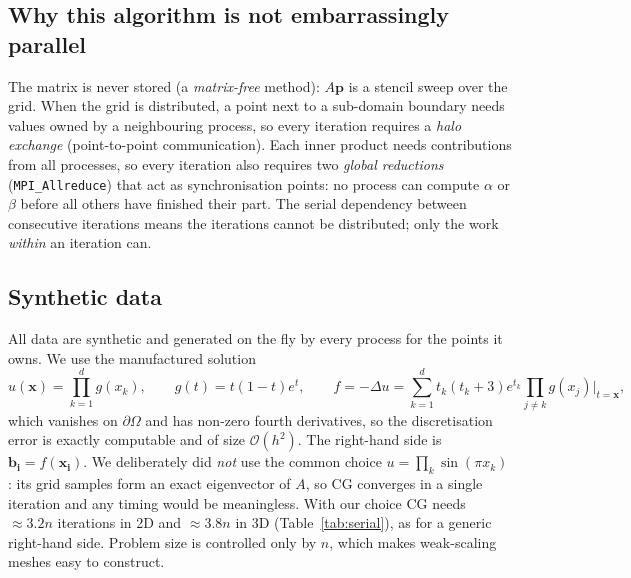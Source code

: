 \documentclass[11pt,a4paper]{article}
\begin{document}
\subsection{Why this algorithm is not embarrassingly parallel}
The matrix is never stored (a \emph{matrix-free} method): $A\mathbf p$ is a stencil sweep
over the grid. When the grid is distributed, a point next to a sub-domain boundary needs
values owned by a neighbouring process, so every iteration requires a \emph{halo exchange}
(point-to-point communication). Each inner product needs contributions from all processes, so
every iteration also requires two \emph{global reductions} (\texttt{MPI\_Allreduce}) that act
as synchronisation points: no process can compute $\alpha$ or $\beta$ before all others have
finished their part. The serial dependency between consecutive iterations means the iterations
cannot be distributed; only the work \emph{within} an iteration can.

\subsection{Synthetic data}\label{sec:data}
All data are synthetic and generated on the fly by every process for the points it owns. We
use the manufactured solution
\begin{equation}
  u(\mathbf x)=\prod_{k=1}^{d} g(x_k),\qquad g(t)=t(1-t)e^{t},\qquad
  f=-\Delta u=\sum_{k=1}^{d} t_k(t_k+3)e^{t_k}\prod_{j\neq k} g(x_j)\Big|_{t=\mathbf x},
\end{equation}
which vanishes on $\partial\Omega$ and has non-zero fourth derivatives, so the discretisation
error is exactly computable and of size $\mathcal O(h^2)$. The right-hand side is
$\mathbf b_{\mathbf i}=f(\mathbf x_{\mathbf i})$. We deliberately did \emph{not} use the common
choice $u=\prod_k\sin(\pi x_k)$: its grid samples form an exact eigenvector of $A$, so CG
converges in a single iteration and any timing would be meaningless. With our choice CG needs
$\approx3.2n$ iterations in 2D and $\approx3.8n$ in 3D (Table~\ref{tab:serial}), as for a
generic right-hand side. Problem size is controlled only by $n$, which makes weak-scaling
meshes easy to construct.
\end{document}
